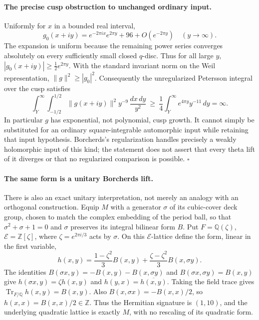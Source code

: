 \paragraph{The precise cusp obstruction to unchanged ordinary input.}
Uniformly for $x$ in a bounded real interval,
\[
                g_0(x+iy)=e^{-2\pi i x}e^{2\pi y}
                                      +96+O(e^{-2\pi y})
                         \quad(y\longrightarrow\infty).
\]
The expansion is uniform because the remaining power
series converges absolutely on every sufficiently
small closed $q$-disc. Thus for all large $y$,
$|g_0(x+iy)|\ge\tfrac12e^{2\pi y}$.
With the standard invariant norm on the Weil
representation, $\|g\|^2\ge|g_0|^2$.
Consequently the unregularized Petersson integral
over the cusp satisfies
\[
 \int_Y^\infty\int_{-1/2}^{1/2}
            \|g(x+iy)\|^2 y^{-9}\,\frac{dx\,dy}{y^2}
       \ \ge\ \frac14\int_Y^\infty e^{4\pi y}y^{-11}\,dy
       =\infty.
 \tag{P-F46h}
\]
In particular $g$ has exponential, not polynomial,
cusp growth. It cannot simply be substituted for an
ordinary square-integrable automorphic input while
retaining that input hypothesis. Borcherds's
regularization handles precisely a weakly holomorphic
input of this kind; the statement does not assert
that every theta lift of it diverges or that no
regularized comparison is possible.
\hfill$\square$

\paragraph{The same form is a unitary Borcherds lift.}
There is also an exact unitary interpretation, not merely
an analogy with an orthogonal construction. Equip $M$ with
a generator $\sigma$ of its cubic-cover deck group,
chosen to match the complex embedding of the period ball,
so that
$\sigma^2+\sigma+1=0$ and $\sigma$ preserves its integral
bilinear form $B$. Put $F=\mathbb Q(\zeta)$,
$\mathcal E=\mathbb Z[\zeta]$, where
$\zeta=e^{2\pi i/3}$ acts by $\sigma$. On this
$\mathcal E$-lattice define the form, linear in the first
variable,
\[
 h(x,y)=\frac{1-\zeta^2}{3}B(x,y)
           +\frac{\zeta-\zeta^2}{3}B(x,\sigma y).
 \tag{P-F46l}
\]
The identities $B(\sigma x,y)=-B(x,y)-B(x,\sigma y)$
and $B(\sigma x,\sigma y)=B(x,y)$ give
$h(\sigma x,y)=\zeta h(x,y)$ and
$h(y,x)=\overline{h(x,y)}$. Taking the field trace gives
$\operatorname{Tr}_{F/\mathbb Q}h(x,y)=B(x,y)$.
Also $B(x,\sigma x)=-B(x,x)/2$, so
$h(x,x)=B(x,x)/2\in\mathbb Z$.
Thus the Hermitian signature is $(1,10)$, and the
underlying quadratic lattice is exactly $M$, with no
rescaling of its quadratic form.

